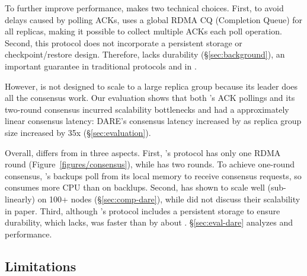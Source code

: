 % 


To further improve performance, \dare makes two technical choices. First, to 
avoid delays caused by polling ACKs, \dare uses a global RDMA CQ (Completion 
Queue) for all replicas, making it possible to collect multiple ACKs each poll 
operation. Second, this protocol does not incorporate a persistent storage or 
checkpoint/restore design. Therefore, \dare lacks durability 
(\S\ref{sec:background}), an important guarantee in traditional \paxos 
protocols and in \xxx.


However, \dare is not designed to scale to a large replica group because its 
leader does all the consensus work. Our evaluation shows that both \dare's ACK 
pollings and its two-round consensus incurred scalability bottlenecks and had a
approximately linear consensus latency: DARE's consensus latency increased by 
\darescalability as replica group size increased by 35x 
(\S\ref{sec:evaluation}).

Overall, \xxx differs from \dare in three aspects. First, \xxx's protocol has 
only one RDMA round (Figure~\ref{figures/consensus}), while \dare has two 
rounds. To achieve one-round consensus, \xxx's backups poll from its local 
memory to receive consensus requests, so \xxx consumes more CPU than \dare on 
backlups. Second, \xxx has shown to scale well (sub-linearly) on 100+ nodes 
(\S\ref{sec:comp-dare}), while \dare did not discuss their scalability in paper. 
Third, although \xxx's protocol includes a persistent storage to ensure 
durability, which \dare lacks, \xxx was faster than \dare by about 
\fasterDARE. \S\ref{sec:eval-dare} analyzes \xxx and \dare performance.

\subsection{\xxx Limitations}\label{sec:limits}

